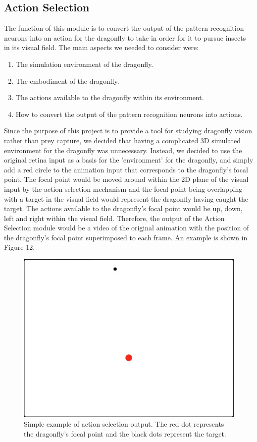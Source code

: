 \documentclass[a4paper,11pt]{article}
\begin{document}
\subsection{Action Selection}

The function of this module is to convert the output of the pattern recognition neurons into an action for the dragonfly to take in order for it to pursue insects in its visual field.
The main aspects we needed to consider were:
\begin{enumerate}
	\item The simulation environment of the dragonfly.
	\item The embodiment of the dragonfly.
	\item The actions available to the dragonfly within its environment.
	\item How to convert the output of the pattern recognition neurons into actions.
\end{enumerate}


	Since the purpose of this project is to provide a tool for studying dragonfly vision rather than prey capture, we decided that having a complicated 3D simulated environment for the dragonfly was unnecessary. Instead, we decided to use the original retina input as a basis for the 'environment' for the dragonfly, and simply add a red circle to the animation input that corresponds to the dragonfly's focal point. The focal point would be moved around within the 2D plane of the visual input by the action selection mechanism and the focal point being overlapping with a target in the visual field would represent the dragonfly having caught the target. The actions available to the dragonfly's focal point would be up, down, left and right within the visual field. Therefore, the output of the Action Selection module would be a video of the original animation with the position of the dragonfly's focal point superimposed to each frame. An example is shown in Figure 12.

\begin{figure}[H]
\centering
\includegraphics[scale = 0.3]{as_example}
\caption{Simple example of action selection output. The red dot represents the dragonfly's focal point and the black dots represent the target.}
\end{figure}
\end{document}
